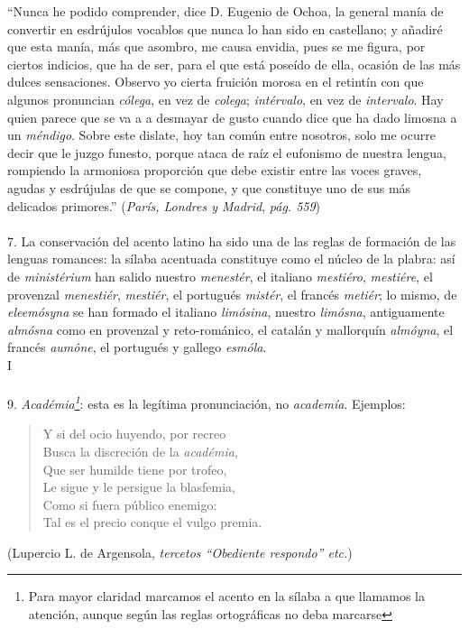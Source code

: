 \documentclass{book}
\begin{document}
``Nunca he podido comprender, dice D. Eugenio de Ochoa, la general manía de convertir en esdrújulos 
vocablos que nunca lo han sido en castellano; y añadiré que esta manía, más que asombro, me causa 
envidia, pues se me figura, por ciertos indicios, que ha de ser, para el que está poseído de ella, 
ocasión de las más dulces sensaciones. Observo yo cierta fruición morosa en el retintín con que algunos 
pronuncian \emph{cólega}, en vez de \emph{colega}; \emph{intérvalo}, en vez de \emph{intervalo}. Hay 
quien parece que se va a a desmayar de gusto cuando dice que ha dado limosna a un \emph{méndigo}. Sobre 
este dislate, hoy tan común entre nosotros, solo me ocurre decir que le juzgo funesto, porque ataca de 
raíz el eufonismo de nuestra lengua, rompiendo la armoniosa proporción que debe existir entre las voces 
graves, agudas y esdrújulas de que se compone, y que constituye uno de sus más delicados primores.'' 
(\emph{París, Londres y Madrid}, \emph{pág. 559})

\small

\paragraph{} 7. La conservación del acento latino ha sido una de las reglas de formación de las lenguas 
romances: la sílaba acentuada constituye como el núcleo de la plabra: así de \emph{ministérium} han 
salido nuestro \emph{menestér}, el italiano \emph{mestiéro}, \emph{mestiére}, el provenzal 
\emph{menestiér}, \emph{mestiér}, el portugués \emph{mistér}, el francés \emph{metiér}; lo mismo, de
\emph{eleemósyna} se han formado el italiano \emph{limósina}, nuestro \emph{limósna}, antiguamente 
\emph{almósna} como en provenzal y reto-románico, el catalán y mallorquín \emph{almóyna}, el francés
\emph{aumône}, el portugués y gallego \emph{esmóla}.
\\

I

\normalsize

\paragraph{} 9. \emph{Académia\footnote{Para mayor claridad marcamos el acento en la sílaba a que llamamos 
la atención, aunque según las reglas ortográficas no deba marcarse}}: esta es la legítima pronunciación, no \emph{academía}. Ejemplos:

\small

\begin{verse}
Y si del ocio huyendo, por recreo \\
Busca la discreción de la \emph{académia}, \\
Que ser humilde tiene por trofeo, \\
Le sigue y le persigue la blasfemia, \\
Como si fuera público enemigo: \\
Tal es el precio conque el vulgo premia. \\
\end{verse}
\begin{flushright}
(Lupercio L. de Argensola, \emph{tercetos ``Obediente respondo'' etc.})
\end{flushright}
\end{document}
